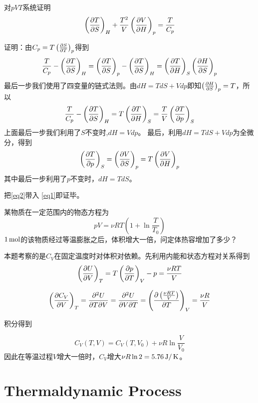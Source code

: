 \documentclass[CJK]{beamer}
\begin{document}
\begin{frame}
  \bch
  对$pVT$系统证明
  $$\pfrac TSH +\frac{T^2}{V} \pfrac VHp = \frac{T}{C_p} $$
  \ech
\end{frame}

\begin{frame}
  \bch
  {\scriptsize
  证明：由$C_p = T\pfrac STp$得到
  $$ \frac{T}{C_p} - \pfrac TSH = \pfrac TSp - \pfrac TSH = \pfrac THS \pfrac HSp $$
  最后一步我们使用了四变量的链式法则。由$dH = TdS + Vdp$即知$\pfrac HSp = T$，所以
  \begin{equation}
    \frac{T}{C_p} - \pfrac TSH = T \pfrac THS = \frac{T}{V} \pfrac TpS \label{eq1}
  \end{equation}
  上面最后一步我们利用了$S$不变时,$ dH = Vdp$。
  最后，利用$dH  = TdS +Vdp$为全微分，得到
  \begin{equation}
    \pfrac TpS = \pfrac VSp = T\pfrac VHp \label{eq2}
  \end{equation}
  其中最后一步利用了$p$不变时，$dH = TdS$。

  把\eqref{eq2}带入 \eqref{eq1}即证毕。
  
  }
  \ech
\end{frame}

\begin{frame}
  \bch
  某物质在一定范围内的物态方程为
  $$ pV = \nu R T\left(1+\ln\frac{T}{T_0}\right) $$
  $1\SImol$的该物质经过等温膨胀之后，体积增大一倍，问定体热容增加了多少？
  \ech
\end{frame}

\begin{frame}
  \bch
  {\scriptsize
    本题考察的是$C_V$在固定温度时对体积对依赖。先利用内能和状态方程对关系得到
    $$\pfrac UVT = T\pfrac pTV - p = \frac{\nu RT}{V} $$
    
  $$\pfrac {C_V}VT = \frac{\partial^2U}{\partial T\partial V} = \frac{\partial^2U}{\partial V\partial T} = \pfrac {\left(\frac{\nu RT}{V}\right)}{T}V =\frac{\nu R}{V} $$

    积分得到

    $$ C_V(T, V) = C_V(T, V_0) + \nu R \ln\frac{V}{V_0}$$
    因此在等温过程$V$增大一倍时，$C_V$增大$\nu R \ln 2 = 5.76 \SIJ/\SIK$。

  }
  \ech
\end{frame}


\section{Thermaldynamic Process}
\end{document}
